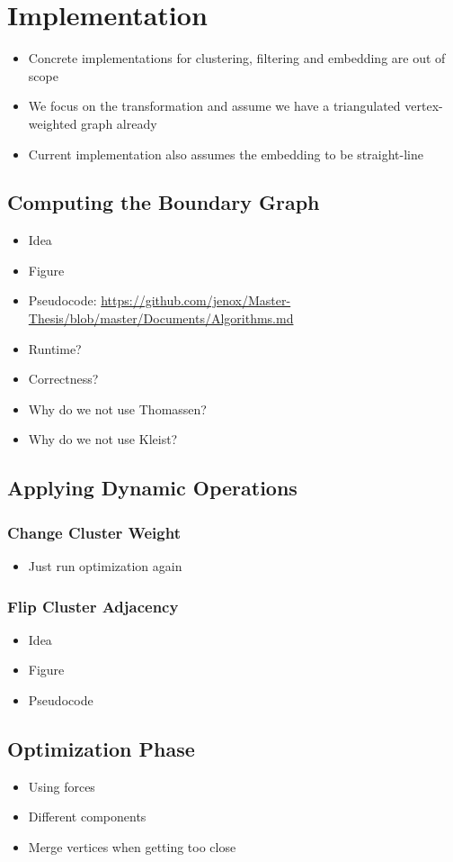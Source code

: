 \chapter{Implementation}
\label{chap:implementation}

\begin{itemize}
	\item Concrete implementations for clustering, filtering and embedding are out of scope
	\item We focus on the transformation and assume we have a triangulated vertex-weighted graph already
	\item Current implementation also assumes the embedding to be straight-line
\end{itemize}



\section{Computing the Boundary Graph}

\begin{itemize}
	\item Idea
	\item Figure
	\item Pseudocode: \url{https://github.com/jenox/Master-Thesis/blob/master/Documents/Algorithms.md}
	\item Runtime?
	\item Correctness?
	\item Why do we not use Thomassen?
	\item Why do we not use Kleist?
\end{itemize}



\section{Applying Dynamic Operations}

\subsection{Change Cluster Weight}

\begin{itemize}
	\item Just run optimization again
\end{itemize}

\subsection{Flip Cluster Adjacency}

\begin{itemize}
	\item Idea
	\item Figure
	\item Pseudocode
\end{itemize}



\section{Optimization Phase}

\begin{itemize}
	\item Using forces
	\item Different components
	\item Merge vertices when getting too close
\end{itemize}

